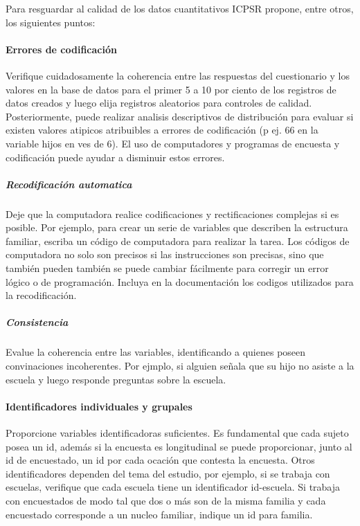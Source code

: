 \documentclass[
  14pt,
]{book}
\begin{document}
Para resguardar al calidad de los datos cuantitativos ICPSR propone, entre otros, los siguientes puntos:

\hypertarget{errores-de-codificaciuxf3n}{%
\paragraph{Errores de codificación}\label{errores-de-codificaciuxf3n}}

Verifique cuidadosamente la coherencia entre las respuestas del cuestionario y los valores en la base de datos para el primer 5 a 10 por ciento de los registros de datos creados y luego elija registros aleatorios para controles de calidad. Posteriormente, puede realizar analisis descriptivos de distribución para evaluar si existen valores atipicos atribuibles a errores de codificación (p ej. 66 en la variable hijos en ves de 6). El uso de computadores y programas de encuesta y codificación puede ayudar a disminuir estos errores.

\hypertarget{recodificaciuxf3n-automatica}{%
\subparagraph{Recodificación automatica}\label{recodificaciuxf3n-automatica}}

Deje que la computadora realice codificaciones y rectificaciones complejas si es posible. Por ejemplo, para crear un serie de variables que describen la estructura familiar, escriba un código de computadora para realizar la tarea.
Los códigos de computadora no solo son precisos si las instrucciones son precisas, sino que también pueden
también se puede cambiar fácilmente para corregir un error lógico o de programación. Incluya en la documentación los codigos utilizados para la recodificación.

\hypertarget{consistencia}{%
\subparagraph{Consistencia}\label{consistencia}}

Evalue la coherencia entre las variables, identificando a quienes poseen convinaciones incoherentes. Por ejmplo, si alguien señala que su hijo no asiste a la escuela y luego responde preguntas sobre la escuela.

\hypertarget{identificadores-individuales-y-grupales}{%
\paragraph{Identificadores individuales y grupales}\label{identificadores-individuales-y-grupales}}

Proporcione variables identificadoras suficientes. Es fundamental que cada sujeto posea un id, además si la encuesta es longitudinal se puede proporcionar, junto al id de encuestado, un id por cada ocación que contesta la encuesta. Otros identificadores dependen del tema del estudio, por ejemplo, si se trabaja con escuelas, verifique que cada escuela tiene un identificador id-escuela. Si trabaja con encuestados de modo tal que dos o más son de la misma familia y cada encuestado corresponde a un nucleo familiar, indique un id para familia.
\end{document}
